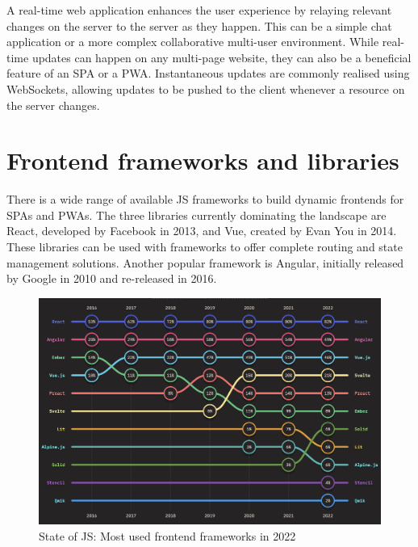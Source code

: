 A real-time web application enhances the user experience by relaying relevant changes on the server to the server as they happen. This can be a simple chat application or a more complex collaborative multi-user environment. While real-time updates can happen on any multi-page website, they can also be a beneficial feature of an \ac{SPA} or a \ac{PWA}. Instantaneous updates are commonly realised using WebSockets, allowing updates to be pushed to the client whenever a resource on the server changes.



\section{Frontend frameworks and libraries}

There is a wide range of available \ac{JS} frameworks to build dynamic frontends for \ac{SPA}s and \ac{PWA}s. The three libraries currently dominating the landscape are React, developed by Facebook in 2013, and Vue, created by Evan You in 2014. These libraries can be used with frameworks to offer complete routing and state management solutions. Another popular framework is Angular, initially released by Google in 2010 and re-released in 2016.

\begin{figure}[h]
    \centering
    \includegraphics[scale=0.4]{04_Artefakte/01_Abbildungen/stateofjs-usage-frontend-frameworks-2022}
    \caption[Most used frontend frameworks in 2022]{State of JS: Most used frontend frameworks in 2022\protect\footnotemark}
    \label{fig:mostUsedFrameworks}
\end{figure}

